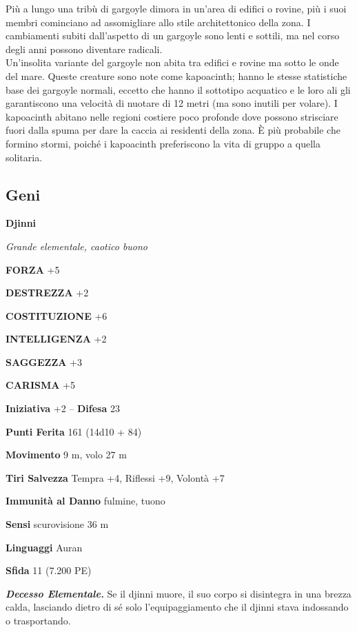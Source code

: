 \begin{multicols}{2}
Più a lungo una tribù di gargoyle dimora in un'area di edifici o rovine, più i suoi membri cominciano ad assomigliare allo stile architettonico della zona. I cambiamenti subiti dall'aspetto di un gargoyle sono lenti e sottili, ma nel corso degli anni possono diventare radicali.\\

Un'insolita variante del gargoyle non abita tra edifici e rovine ma sotto le onde del mare. Queste creature sono note come kapoacinth; hanno le stesse statistiche base dei gargoyle normali, eccetto che hanno il sottotipo acquatico e le loro ali gli garantiscono una velocità di nuotare di 12 metri (ma sono inutili per volare). I kapoacinth abitano nelle regioni costiere poco profonde dove possono strisciare fuori dalla spuma per dare la caccia ai residenti della zona. È più probabile che formino stormi, poiché i kapoacinth preferiscono la vita di gruppo a quella solitaria.\\



\subsection{Geni}

\medskip{}\textbf{Djinni}

\emph{Grande elementale, caotico buono}

\textbf{FORZA} +5

\textbf{DESTREZZA} +2

\textbf{COSTITUZIONE} +6

\textbf{INTELLIGENZA} +2

\textbf{SAGGEZZA} +3

\textbf{CARISMA} +5

\textbf{Iniziativa} +2 -- \textbf{Difesa} 23

\textbf{Punti Ferita} 161 (14d10 + 84)

\textbf{Movimento} 9 m, volo 27 m

\textbf{Tiri Salvezza} Tempra +4, Riflessi +9, Volontà +7

\textbf{Immunità al Danno} fulmine, tuono

\textbf{Sensi} scurovisione 36 m

\textbf{Linguaggi} Auran

\textbf{Sfida} 11 (7.200 PE)

\emph{\textbf{Decesso Elementale.}} Se il djinni muore, il suo corpo si disintegra in una brezza calda, lasciando dietro di sé solo l'equipaggiamento che il djinni stava indossando o trasportando.


\end{multicols}
